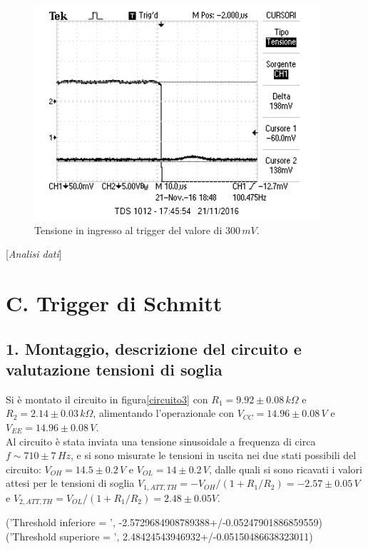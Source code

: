 \documentclass[10pt,a4paper]{article}
\newcommand{\rem}[1]{[\emph{#1}]}
\begin{document}
\begin{figure}[h]
\centering
\includegraphics[scale=1.0]{immagini/morto.png}
\caption{Tensione in ingresso al trigger del valore di $300 \, mV$.}
\label{inizamorire}
\end{figure}

\rem{Analisi dati}

\section*{C. Trigger di Schmitt}
\subsection{1. Montaggio, descrizione del circuito e valutazione tensioni di soglia}
Si è montato il circuito in figura\ref{circuito3} con $R_1 = 9.92\pm0.08 \, k\Omega$ e $R_2 = 2.14 \pm 0.03 \, k\Omega$, alimentando l'operazionale con $V_{CC} = 14.96\pm0.08 \, V$ e $V_{EE} = 14.96 \pm 0.08 \, V$.\\

Al circuito è stata inviata una tensione sinusoidale a frequenza di circa $f \sim 710 \pm 7 \, Hz$, e si sono misurate le tensioni in uscita nei due stati possibili del circuito: $V_{OH} = 14.5\pm 0.2 \, V$ e $V_{OL} = 14\pm0.2 \, V$, dalle quali si sono ricavati i valori attesi per le tensioni di soglia $V_{1,ATT,TH}= -V_{OH}/(1+R_1/R_2)= -2.57 \pm 0.05 \, V$ e $V_{2,ATT,TH}= V_{OL}/(1+R_1/R_2) = 2.48 \pm 0.05 V$. 

('Threshold inferiore = ', -2.5729684908789388+/-0.05247901886859559)
('Threshold superiore = ', 2.48424543946932+/-0.05150486638323011)
\end{document}
